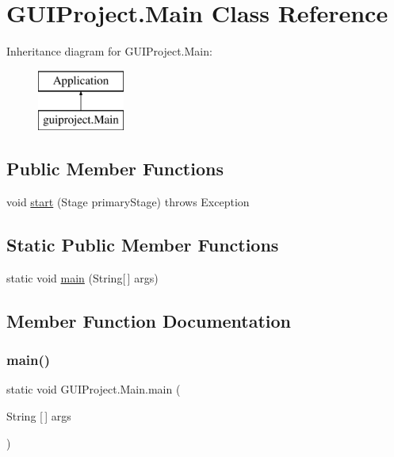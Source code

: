\hypertarget{class_g_u_i_project_1_1_main}{}\section{G\+U\+I\+Project.\+Main Class Reference}
\label{class_g_u_i_project_1_1_main}
Inheritance diagram for G\+U\+I\+Project.\+Main\+:\begin{figure}[H]
\begin{center}
\leavevmode
\includegraphics[height=2.000000cm]{class_g_u_i_project_1_1_main}
\end{center}
\end{figure}
\subsection*{Public Member Functions}
\begin{DoxyCompactItemize}
\item 
void \mbox{\hyperlink{class_g_u_i_project_1_1_main_ac62ddcbc1f07334316eed6524523acf2}{start}} (Stage primary\+Stage)  throws Exception 
\end{DoxyCompactItemize}
\subsection*{Static Public Member Functions}
\begin{DoxyCompactItemize}
\item 
static void \mbox{\hyperlink{class_g_u_i_project_1_1_main_a58b1b7ff03620b0502e71fdf43ffb94f}{main}} (String\mbox{[}$\,$\mbox{]} args)
\end{DoxyCompactItemize}


\subsection{Member Function Documentation}
\mbox{\label{class_g_u_i_project_1_1_main_a58b1b7ff03620b0502e71fdf43ffb94f}} 
\subsubsection{\texorpdfstring{main()}{main()}}
{\footnotesize\ttfamily static void G\+U\+I\+Project.\+Main.\+main (\begin{DoxyParamCaption}\item[{String \mbox{[}$\,$\mbox{]}}]{args }\end{DoxyParamCaption})\hspace{0.3cm}{\ttfamily [static]}}


